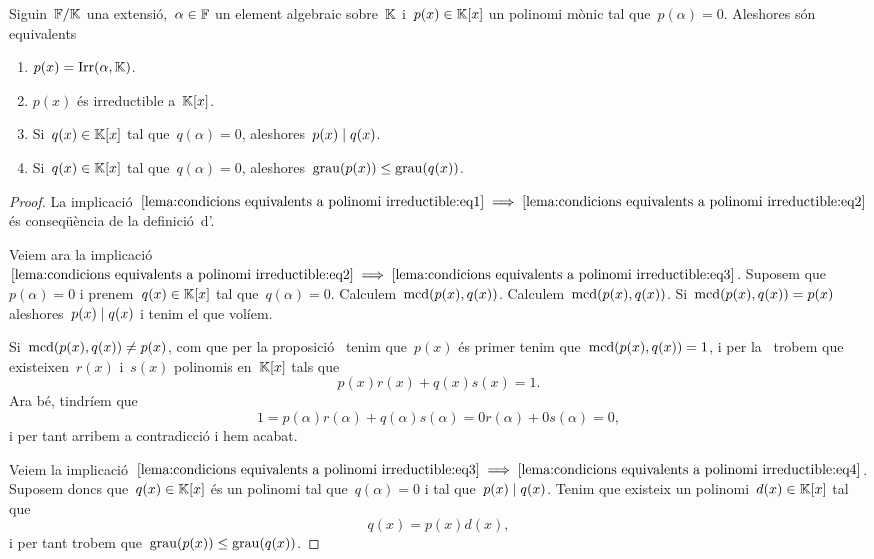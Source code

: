 \documentclass[../../Main.tex]{subfiles}
\begin{document}
	\begin{lemma}
		\label{lema:condicions equivalents a polinomi irreductible}
		Siguin~\(\mathbb{F}/\mathbb{K}\) una extensió,~\(\alpha\in\mathbb{F}\) un element algebraic sobre~\(\mathbb{K}\) i~\(p(x)\in\mathbb{K}[x]\) un polinomi mònic tal que~\(p(\alpha)=0\). Aleshores són equivalents
		\begin{enumerate}
		\item\label{lema:condicions equivalents a polinomi irreductible:eq1} \(p(x)=\operatorname{Irr}(\alpha,\mathbb{K})\).
		\item\label{lema:condicions equivalents a polinomi irreductible:eq2} \(p(x)\) és irreductible a~\(\mathbb{K}[x]\).
		\item\label{lema:condicions equivalents a polinomi irreductible:eq3} Si~\(q(x)\in\mathbb{K}[x]\) tal que~\(q(\alpha)=0\), aleshores~\(p(x)\mathrel{|} q(x)\).
		\item\label{lema:condicions equivalents a polinomi irreductible:eq4} Si~\(q(x)\in\mathbb{K}[x]\) tal que~\(q(\alpha)=0\), aleshores~\(\operatorname{grau}(p(x))\leq\operatorname{grau}(q(x))\).
		\end{enumerate}
		\begin{proof}
			La implicació~\(\eqref{lema:condicions equivalents a polinomi irreductible:eq1}\implies\eqref{lema:condicions equivalents a polinomi irreductible:eq2}\) és conseqüència de la definició~d'.
			
			Veiem ara la implicació~\(\eqref{lema:condicions equivalents a polinomi irreductible:eq2}\implies\eqref{lema:condicions equivalents a polinomi irreductible:eq3}\). Suposem que~\(p(\alpha)=0\) i prenem~\(q(x)\in\mathbb{K}[x]\) tal que~\(q(\alpha)=0\). Calculem~\(\operatorname{mcd}(p(x),q(x))\). Calculem~\(\operatorname{mcd}(p(x),q(x))\). Si~\(\operatorname{mcd}(p(x),q(x))=p(x)\) aleshores~\(p(x)\mathrel{|} q(x)\) i tenim el que volíem.
			
			Si~\(\operatorname{mcd}(p(x),q(x))\neq p(x)\), com que per la proposició~ tenim que~\(p(x)\) és primer tenim que~\(\operatorname{mcd}(p(x),q(x))=1\), i per la~ trobem que existeixen~\(r(x)\) i~\(s(x)\) polinomis en~\(\mathbb{K}[x]\) tals que
			\[
			    p(x)r(x)+q(x)s(x)=1.
			\]
			Ara bé, tindríem que
			\[
				1=p(\alpha)r(\alpha)+q(\alpha)s(\alpha)=0r(\alpha)+0s(\alpha)=0,
			\]
			i per tant arribem a contradicció i hem acabat.
			
			Veiem la implicació~\(\eqref{lema:condicions equivalents a polinomi irreductible:eq3}\implies\eqref{lema:condicions equivalents a polinomi irreductible:eq4}\). Suposem doncs que~\(q(x)\in\mathbb{K}[x]\) és un polinomi tal que~\(q(\alpha)=0\) i tal que~\(p(x)\mathrel{|} q(x)\). Tenim que existeix un polinomi~\(d(x)\in\mathbb{K}[x]\) tal que
			\[
			    q(x)=p(x)d(x),
			\]
			i per tant trobem que~\(\operatorname{grau}(p(x))\leq\operatorname{grau}(q(x))\).
			

\end{proof}
\end{lemma}
\end{document}

